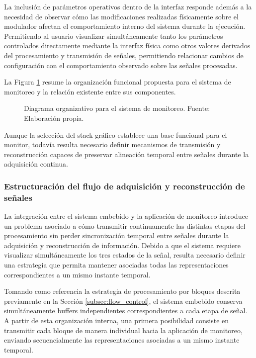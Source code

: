 La inclusión de parámetros operativos dentro de la interfaz responde además a la necesidad de observar cómo las modificaciones realizadas físicamente sobre el modulador afectan el comportamiento interno del sistema durante la ejecución. Permitiendo al usuario visualizar simultáneamente tanto los parámetros controlados directamente mediante la interfaz física como otros valores derivados del procesamiento y transmisión de señales, permitiendo relacionar cambios de configuración con el comportamiento observado sobre las señales procesadas.

La Figura \ref{fig:monitor_architecture} resume la organización funcional propuesta para el sistema de monitoreo y la relación existente entre sus componentes.

\begin{figure}[H]
    \centering
    \resizebox{0.6\textwidth}{!}{
        
    }
    \caption{Diagrama organizativo para el sistema de monitoreo. Fuente: Elaboración propia.}
    \label{fig:monitor_architecture}
\end{figure}

Aunque la selección del stack gráfico establece una base funcional para el monitor, todavía resulta necesario definir mecanismos de transmisión y reconstrucción capaces de preservar alineación temporal entre señales durante la adquisición continua.


\subsubsection{Estructuración del flujo de adquisición y reconstrucción de señales}

La integración entre el sistema embebido y la aplicación de monitoreo introduce un problema asociado a cómo transmitir continuamente las distintas etapas del procesamiento sin perder sincronización temporal entre señales durante la adquisición y reconstrucción de información. Debido a que el sistema requiere visualizar simultáneamente los tres estados de la señal, resulta necesario definir una estrategia que permita mantener asociadas todas las representaciones correspondientes a un mismo instante temporal.

Tomando como referencia la estrategia de procesamiento por bloques descrita previamente en la Sección \ref{subsec:flow_control}, el sistema embebido conserva simultáneamente buffers independientes correspondientes a cada etapa de señal. A partir de esta organización interna, una primera posibilidad consiste en transmitir cada bloque de manera individual hacia la aplicación de monitoreo, enviando secuencialmente las representaciones asociadas a un mismo instante temporal.

